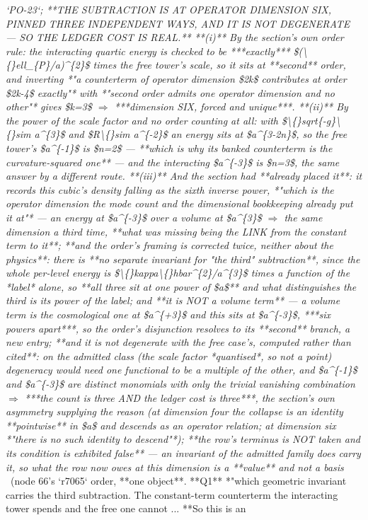\begin{description}
\textit{`PO-23`;  **THE SUBTRACTION IS AT OPERATOR DIMENSION SIX, PINNED THREE INDEPENDENT WAYS, AND IT IS NOT DEGENERATE --- SO THE LEDGER COST IS REAL.** **(i)** By the section's own order rule: the interacting quartic energy is checked to be ***exactly*** \$(\textbackslash\{\}ell\_\{P\}/a)\textasciicircum{}\{2\}\$ times the free tower's scale, so it sits at **second** order, and inverting *"a counterterm of operator dimension \$2k\$ contributes at order \$2k-4\$ exactly"* with *"second order admits one operator dimension and no other"* gives \$k=3\$ \ensuremath{\Rightarrow} ***dimension SIX, forced and unique***. **(ii)** By the power of the scale factor and no order counting at all: with \$\textbackslash\{\}sqrt\{-g\}\textbackslash\{\}sim a\textasciicircum{}\{3\}\$ and \$R\textbackslash\{\}sim a\textasciicircum{}\{-2\}\$ an energy sits at \$a\textasciicircum{}\{3-2n\}\$, so the free tower's \$a\textasciicircum{}\{-1\}\$ is \$n=2\$ --- **which is why its banked counterterm is the curvature-squared one** --- and the interacting \$a\textasciicircum{}\{-3\}\$ is \$n=3\$, the same answer by a different route. **(iii)** And the section had **already placed it**: it records this cubic's density falling as the sixth inverse power, *"which is the operator dimension the mode count and the dimensional bookkeeping already put it at"* --- an energy at \$a\textasciicircum{}\{-3\}\$ over a volume at \$a\textasciicircum{}\{3\}\$ \ensuremath{\Rightarrow} the same dimension a third time, **what was missing being the LINK from the constant term to it**;  **and the order's framing is corrected twice, neither about the physics**: there is **no separate invariant for "the third" subtraction**, since the whole per-level energy is \$\textbackslash\{\}kappa\textbackslash\{\}hbar\textasciicircum{}\{2\}/a\textasciicircum{}\{3\}\$ times a function of the *label* alone, so **all three sit at one power of \$a\$** and what distinguishes the third is its power of the label; and  **it is NOT a volume term** --- a volume term is the cosmological one at \$a\textasciicircum{}\{+3\}\$ and this sits at \$a\textasciicircum{}\{-3\}\$, ***six powers apart***, so the order's disjunction resolves to its **second** branch, a new entry;  **and it is not degenerate with the free case's, computed rather than cited**: on the admitted class (the scale factor *quantised*, so not a point) degeneracy would need one functional to be a multiple of the other, and \$a\textasciicircum{}\{-1\}\$ and \$a\textasciicircum{}\{-3\}\$ are distinct monomials with only the trivial vanishing combination \ensuremath{\Rightarrow} ***the count is three AND the ledger cost is three***, the section's own asymmetry supplying the reason (at dimension four the collapse is an identity **pointwise** in \$a\$ and descends as an operator relation; at dimension six *"there is no such identity to descend"*);  **the row's terminus is NOT taken and its condition is exhibited false** --- an invariant of the admitted family does carry it, so what the row now owes at this dimension is a **value** and not a basis} \ (node 66's `r7065` order, **one object**. **Q1** *"which geometric invariant carries the third subtraction. The constant-term counterterm the interacting tower spends and the free one cannot ... **So this is an 
\end{description}
